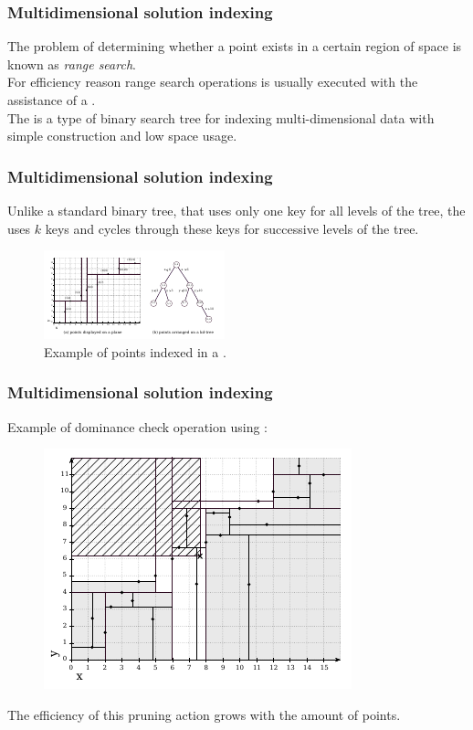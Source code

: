 %
\begin{frame}
\frametitle{Multidimensional solution indexing}
The problem of determining whether a point exists in a certain region
of space is known as \emph{range search}.
\\ \bigskip \pause
For efficiency reason range search operations is usually executed with the
assistance of a \kdtree{}.
\\ \bigskip \pause
The \kdtree{} is a type of binary search tree for indexing multi-dimensional
data with simple construction and low space usage.
\end{frame}

%
\begin{frame}
\frametitle{Multidimensional solution indexing}
Unlike a standard binary tree, that uses only one key for all levels of the tree,
the \kdtree{} uses $k$ keys and cycles through these keys for successive levels
of the tree.
\begin{figure}
  \centering
  \includegraphics[scale=3]{img/kdt/dom-kd}
  \caption{Example of points indexed in a \kdtree{}.}
\end{figure}
\end{frame}

%
\begin{frame}
\frametitle{Multidimensional solution indexing}
Example of dominance check operation using \kdtree{}:
\begin{figure}
  \centering
  \includegraphics[scale=1.0]{img/kdt/query}
\end{figure}
\pause
The efficiency of this pruning action grows
with the amount of points.
\end{frame}


